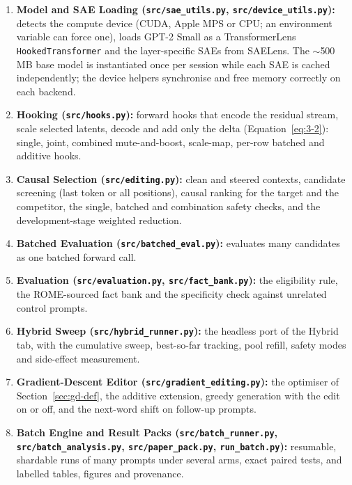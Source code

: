\documentclass[12pt,a4paper]{report}
\begin{document}
\begin{enumerate}
  \item \textbf{Model and SAE Loading (\texttt{src/\allowbreak{}sae\_\allowbreak{}utils.\allowbreak{}py}, \texttt{src/\allowbreak{}device\_\allowbreak{}utils.\allowbreak{}py}):} detects the compute device (CUDA, Apple MPS or CPU; an environment variable can force one), loads GPT-2 Small as a TransformerLens \texttt{HookedTransformer} and the layer-specific SAEs from SAELens. The $\sim$500 MB base model is instantiated once per session while each SAE is cached independently; the device helpers synchronise and free memory correctly on each backend.
  \item \textbf{Hooking (\texttt{src/\allowbreak{}hooks.\allowbreak{}py}):} forward hooks that encode the residual stream, scale selected latents, decode and add only the delta (Equation~\ref{eq:3-2}): single, joint, combined mute-and-boost, scale-map, per-row batched and additive hooks.
  \item \textbf{Causal Selection (\texttt{src/\allowbreak{}editing.\allowbreak{}py}):} clean and steered contexts, candidate screening (last token or all positions), causal ranking for the target and the competitor, the single, batched and combination safety checks, and the development-stage weighted reduction.
  \item \textbf{Batched Evaluation (\texttt{src/\allowbreak{}batched\_\allowbreak{}eval.\allowbreak{}py}):} evaluates many candidates as one batched forward call.
  \item \textbf{Evaluation (\texttt{src/\allowbreak{}evaluation.\allowbreak{}py}, \texttt{src/\allowbreak{}fact\_\allowbreak{}bank.\allowbreak{}py}):} the eligibility rule, the ROME-sourced fact bank and the specificity check against unrelated control prompts.
  \item \textbf{Hybrid Sweep (\texttt{src/\allowbreak{}hybrid\_\allowbreak{}runner.\allowbreak{}py}):} the headless port of the Hybrid tab, with the cumulative sweep, best-so-far tracking, pool refill, safety modes and side-effect measurement.
  \item \textbf{Gradient-Descent Editor (\texttt{src/\allowbreak{}gradient\_\allowbreak{}editing.\allowbreak{}py}):} the optimiser of Section~\ref{sec:gd-def}, the additive extension, greedy generation with the edit on or off, and the next-word shift on follow-up prompts.
  \item \textbf{Batch Engine and Result Packs (\texttt{src/\allowbreak{}batch\_\allowbreak{}runner.\allowbreak{}py}, \texttt{src/\allowbreak{}batch\_\allowbreak{}analysis.\allowbreak{}py}, \texttt{src/\allowbreak{}paper\_\allowbreak{}pack.\allowbreak{}py}, \texttt{run\_\allowbreak{}batch.\allowbreak{}py}):} resumable, shardable runs of many prompts under several arms, exact paired tests, and labelled tables, figures and provenance.

\end{enumerate}
\end{document}
